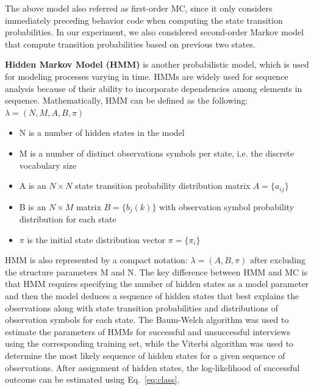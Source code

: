 \documentclass{amia_summit_2018}
\begin{document}
The above model also referred as first-order MC, since it only considers immediately preceding behavior code when computing the state transition probabilities. In our experiment, we also considered second-order Markov model that compute transition probabilities based on previous two states.  

\textbf {Hidden Markov Model (HMM)} is another probabilistic model, which is used for modeling processes varying in time. HMMs are widely used for sequence analysis because of their ability to incorporate dependencies among elements in sequence. Mathematically, HMM can be defined as the following: $\lambda = (N, M, A, B, \pi)$
\begin{itemize}
\item N is a number of hidden states in the model
\item M is a number of distinct observations symbols per state, i.e. the discrete vocabulary size
\item A is an $N\times N$ state transition probability distribution matrix $A = \{a_{ij}\}$
\item B is an $N\times M$ matrix $B = \{b_j(k)\}$ with observation symbol probability distribution for each state 
\item $\pi$ is the initial state distribution vector $\pi = \{\pi_i\}$
\end{itemize}
HMM is also represented by a compact notation: $\lambda = (A, B, \pi)$ after excluding the structure parameters M and N. The key difference between HMM and MC is that HMM requires specifying the number of hidden states as a model parameter and then the model deduces a sequence of hidden states that best explains the observations along with state transition probabilities and distributions of observation symbols for each state. The Baum-Welch algorithm was used to estimate the parameters of HMMs for successful and unsuccessful interviews using the corresponding training set, while the Viterbi algorithm was used to determine the most likely sequence of hidden states for a given sequence of observations. After assignment of hidden states, the log-likelihood of successful outcome can be estimated using Eq.~\ref{eq:class}.
\end{document}
